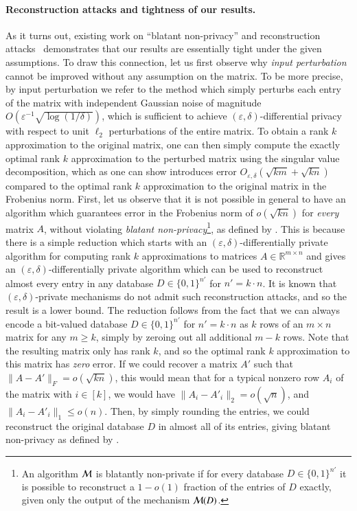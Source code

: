 \documentclass[letterpaper,11pt]{article}
\theoremstyle{definition}
\newcommand{\cM}{{\cal M}}
\renewcommand{\leq}{\leqslant}
\renewcommand{\geq}{\geqslant}
\newcommand{\bits}{\{0,1\}}
\renewcommand{\epsilon}{\varepsilon}
\begin{document}
\paragraph{Reconstruction attacks and tightness of our results.}
As it turns out, existing work on ``blatant non-privacy'' and
reconstruction attacks~\cite{DinurN03} demonstrates that our results are
essentially tight under the given assumptions. To draw this connection, let us
first observe why \emph{input perturbation} cannot be improved without any
assumption on the matrix. To be more precise, by input perturbation we refer
to the method which simply perturbs each entry of the matrix with independent
Gaussian noise of magnitude
$O\left(\epsilon^{-1}\sqrt{\log(1/\delta)}\right)$, which is sufficient to
achieve $(\epsilon,\delta)$-differential privacy with respect to unit $\ell_2$
perturbations of the entire matrix. To obtain a rank $k$ approximation to the
original matrix, one can then simply compute the exactly optimal rank $k$
approximation to the perturbed matrix using the singular value decomposition,
which as one can show introduces error $O_{\epsilon,\delta}\left(\sqrt{km}+\sqrt{kn}\right)$
compared to the optimal rank $k$ approximation to the original matrix in the
Frobenius norm. First, let us observe that it is not possible in general to
have an algorithm which guarantees error in the Frobenius norm of
$o(\sqrt{kn})$ for \emph{every} matrix $A$, without violating \emph{blatant
non-privacy}\footnote{An algorithm $\cM$ is blatantly non-private if for every
database $D\in\bits^{n'}$ it is possible to reconstruct a $1-o(1)$ fraction of
the entries of $D$ exactly, given only the output of the mechanism $\cM(D)$.},
as defined by \cite{DinurN03}.  This is because there is a simple
reduction which starts with an $(\epsilon,\delta)$-differentially private
algorithm for computing rank $k$ approximations to matrices $A \in
\mathbb{R}^{m\times n}$ and gives an $(\epsilon,\delta)$-differentially
private algorithm which can be used to reconstruct almost every entry in any
database $D \in \{0,1\}^{n'}$ for $n' = k\cdot n$. It is known that
$(\epsilon,\delta)$-private mechanisms do not admit such reconstruction
attacks, 
and so the result is a lower
bound. The reduction follows from the fact that we can always encode a
bit-valued database $D \in \{0,1\}^{n'}$ for $n' = k\cdot n$ as $k$ rows of an
$m\times n$ matrix for any $m \geq k$, simply by zeroing out all additional
$m-k$ rows. Note that the resulting matrix only has rank $k$, and so the
optimal rank $k$ approximation to this matrix has \emph{zero}
error. If we could recover a  matrix $A'$ such that $\|A-A'\|_F =
o(\sqrt{kn})$, this would mean that for a typical nonzero row $A_i$ of the
matrix with $i \in [k]$, we would have $\|A_i - A'_i\|_2 = o(\sqrt{n})$, and $\|A_i -
A'_i\|_1 \leq o(n)$. Then, by simply rounding the entries, we could
reconstruct the original database $D$ in almost all of its entries, giving
blatant non-privacy as defined by \cite{DinurN03}.
\end{document}
